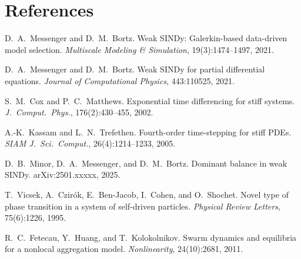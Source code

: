 \documentclass[11pt, letterpaper]{article}
\theoremstyle{definition}
\begin{document}
\section*{References}
\begin{enumerate}[label={[\arabic*]}, nosep]
  \item D.~A.~Messenger and D.~M.~Bortz.
    Weak SINDy: Galerkin-based data-driven model selection.
    \textit{Multiscale Modeling \& Simulation}, 19(3):1474--1497, 2021.
  \item D.~A.~Messenger and D.~M.~Bortz.
    Weak SINDy for partial differential equations.
    \textit{Journal of Computational Physics}, 443:110525, 2021.
  \item S.~M.~Cox and P.~C.~Matthews.
    Exponential time differencing for stiff systems.
    \textit{J.\ Comput.\ Phys.}, 176(2):430--455, 2002.
  \item A.-K.~Kassam and L.~N.~Trefethen.
    Fourth-order time-stepping for stiff PDEs.
    \textit{SIAM J.\ Sci.\ Comput.}, 26(4):1214--1233, 2005.
  \item D.~B.~Minor, D.~A.~Messenger, and D.~M.~Bortz.
    Dominant balance in weak SINDy.
    arXiv:2501.xxxxx, 2025.
  \item T.~Vicsek, A.~Czir\'{o}k, E.~Ben-Jacob, I.~Cohen, and O.~Shochet.
    Novel type of phase transition in a system of self-driven particles.
    \textit{Physical Review Letters}, 75(6):1226, 1995.
  \item R.~C.~Fetecau, Y.~Huang, and T.~Kolokolnikov.
    Swarm dynamics and equilibria for a nonlocal aggregation model.
    \textit{Nonlinearity}, 24(10):2681, 2011.
\end{enumerate}
\end{document}
